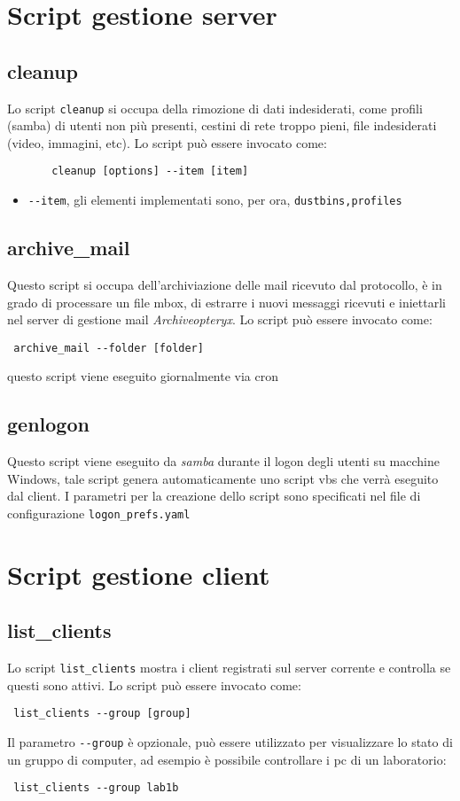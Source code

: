 \documentclass[a4paper,10pt,oneside]{memoir}
\begin{document}
 \chapter{Script gestione server}
    \section*{cleanup}
      Lo script \verb#cleanup# si occupa della rimozione di dati indesiderati, come profili (samba) di utenti non più presenti, cestini di rete troppo pieni, file indesiderati (video, immagini, etc). Lo script può essere invocato come:
      \begin{verbatim}
       cleanup [options] --item [item]
      \end{verbatim}
      \begin{itemize}
	\item \verb#--item#, gli elementi implementati sono, per ora, \verb#dustbins,profiles#  
      \end{itemize}
\section*{archive\_mail}

Questo script si occupa dell'archiviazione delle mail ricevuto dal protocollo, è in grado di processare un file mbox, di estrarre i nuovi messaggi ricevuti e iniettarli nel server di gestione mail \emph{Archiveopteryx}. Lo script può essere invocato come:
\begin{verbatim}
 archive_mail --folder [folder]
\end{verbatim}
questo script viene eseguito giornalmente via cron
\section*{genlogon}
Questo script viene eseguito da \emph{samba} durante il logon degli utenti su macchine Windows, tale script genera automaticamente uno script vbs che verrà eseguito dal client. I parametri per la creazione dello script sono specificati nel file di configurazione \verb#logon_prefs.yaml#


 \chapter{Script gestione client}
\section*{list\_clients}
  Lo script \verb#list_clients# mostra i client registrati sul server corrente e controlla se questi sono attivi. Lo script può essere invocato come:
\begin{verbatim}
 list_clients --group [group]
\end{verbatim}
Il parametro \verb#--group# è opzionale, può essere utilizzato per visualizzare lo stato di un gruppo di computer, ad esempio è possibile controllare i pc di un laboratorio:
\begin{verbatim}
 list_clients --group lab1b
\end{verbatim}
\end{document}
